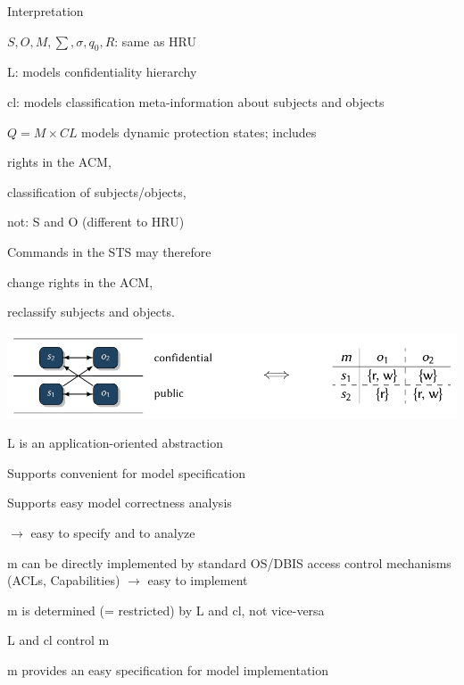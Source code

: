 \documentclass[a4paper]{article}
\begin{document}
\begin{multicols}{3}
    Interpretation
    \begin{itemize*}
        \item $S,O,M,\sum,\sigma,q_0,R$: same as HRU
        \item L: models confidentiality hierarchy
        \item cl: models classification meta-information about subjects and objects
        \item $Q=M\times CL$ models dynamic protection states; includes
        \begin{itemize*}
            \item rights in the ACM,
            \item classification of subjects/objects,
            \item not: S and O (different to HRU)
        \end{itemize*}
        \item Commands in the STS may therefore
        \begin{itemize*}
            \item change rights in the ACM,
            \item reclassify subjects and objects.
        \end{itemize*}
    \end{itemize*}
    \includegraphics[width=\linewidth]{Assets/Systemsicherheit-lattice-vs-acm.png}

    \begin{itemize*}
        \item L is an application-oriented abstraction
        \begin{itemize*}
            \item Supports convenient for model specification
            \item Supports easy model correctness analysis
            \item[$\rightarrow$] easy to specify and to analyze
        \end{itemize*}
        \item m can be directly implemented by standard OS/DBIS access control mechanisms (ACLs, Capabilities) $\rightarrow$ easy to implement
        \item m is determined (= restricted) by L and cl, not vice-versa
        \item L and cl control m
        \item m provides an easy specification for model implementation
    \end{itemize*}


\end{multicols}
\end{document}
